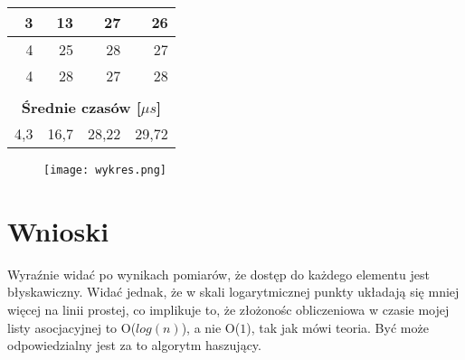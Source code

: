 \documentclass[11pt,a4paper]{article}
\begin{document}
\begin{table}[htbp]
\begin{center}
\begin{tabular}{|r|r|r|r|}
3 & 13 & 27 & 26 \\ \hline
4 & 25 & 28 & 27 \\ \hline
4 & 28 & 27 & 28 \\ \hline
\multicolumn{1}{|l|}{} & \multicolumn{1}{l|}{} & \multicolumn{1}{l|}{} & \multicolumn{1}{l|}{} \\ \hline
\multicolumn{ 4}{|c|}{\textbf{Średnie czasów [$\mu s$]}} \\ \hline
4,3 & 16,7 & 28,22 & 29,72 \\ \hline
\end{tabular}
\end{center}
\label{Wyniki pomiarów2}
\end{table}


\begin{figure}[htbp]
\begin{center}
	\texttt{[image: wykres.png]}
\end{center}
\end{figure}


\section{Wnioski}
\hspace{4ex}Wyraźnie widać po wynikach pomiarów, że dostęp do każdego elementu jest błyskawiczny. Widać jednak, że w skali logarytmicznej punkty układają się mniej więcej na linii prostej, co implikuje to, że złożonośc obliczeniowa w czasie mojej listy asocjacyjnej to O($log(n)$), a nie O($1$), tak jak mówi teoria. Być może odpowiedzialny jest za to algorytm haszujący.
\end{document}
